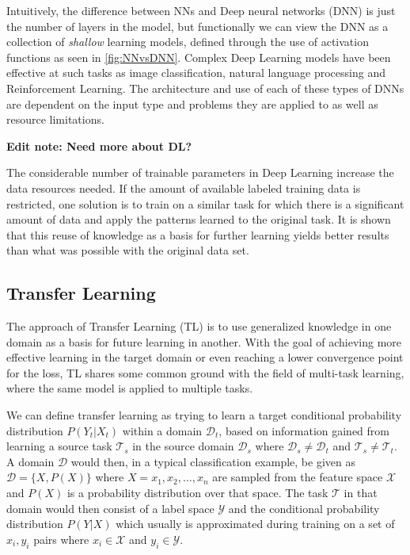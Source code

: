 Intuitively, the difference between NNs and Deep neural networks (DNN) is just the number of layers in the model, but functionally we can view the DNN as a collection of \textit{shallow} learning models, defined through the use of activation functions as seen in \ref{fig:NNvsDNN}. Complex Deep Learning models have been effective at such tasks as image classification\cite{imageclassification}, natural language processing\cite{deepnlp} and Reinforcement Learning\cite{deepreinforcementlearning}. The architecture and use of each of these types of DNNs are dependent on the input type and problems they are applied to as well as resource limitations.

\textbf{Edit note: Need more about DL?}

The considerable number of trainable parameters in Deep Learning increase the data resources needed. If the amount of available labeled training data is restricted, one solution is to train on a similar task for which there is a significant amount of data and apply the patterns learned to the original task. It is shown that this reuse of knowledge as a basis for further learning yields better results than what was possible with the original data set\cite{pathnet, progressiveneuralnetworks, tradaboost}. 

\subsection{Transfer Learning}
\label{background:TL}
The approach of Transfer Learning (TL) is to use generalized knowledge in one domain as a basis for future learning in another. With the goal of achieving more effective learning in the target domain or even reaching a lower convergence point for the loss, TL shares some common ground with the field of multi-task learning, where the same model is applied to multiple tasks. 

We can define transfer learning as trying to learn a target conditional probability distribution \(P(Y_{t}|X_{t})\) within a domain \(\mathcal{D}_{t}\), based on information gained from learning a source task \(\mathcal{T}_{s}\) in the source domain \(\mathcal{D}_{s}\) where \(\mathcal{D}_{s} \neq \mathcal{D}_{t}\) and \(\mathcal{T}_{s} \neq \mathcal{T}_{t}\). A domain \(\mathcal{D}\) would then, in a typical classification example, be given as \(\mathcal{D} = \{X, P(X)\}\) where \(X = x_{1},x_{2}, \dotsc ,x_{n}\) are sampled from the feature space \(\mathcal{X}\) and \(P(X)\) is a probability distribution over that space. The task \(\mathcal{T}\) in that domain would then consist of a label space \(\mathcal{Y}\) and the conditional probability distribution \(P(Y|X)\) which usually is approximated during training on a set of \(x_{i}, y_{i}\) pairs where \(x_{i} \in \mathcal{X}\) and \(y_{i} \in \mathcal{Y}\).
\newline\newline

